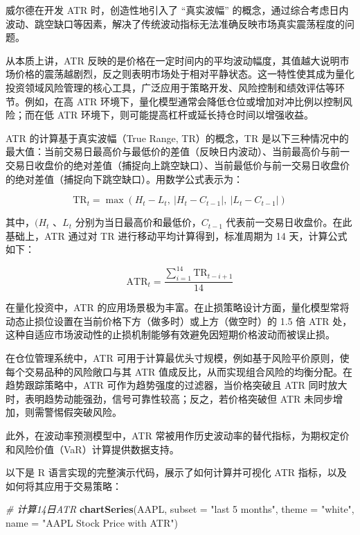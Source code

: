 \documentclass[]{ctexbook}
\newenvironment{Shaded}{\begin{snugshade}}{\end{snugshade}}
\newcommand{\AttributeTok}[1]{\textcolor[rgb]{0.13,0.29,0.53}{#1}}
\newcommand{\CommentTok}[1]{\textcolor[rgb]{0.56,0.35,0.01}{\textit{#1}}}
\newcommand{\FunctionTok}[1]{\textcolor[rgb]{0.13,0.29,0.53}{\textbf{#1}}}
\newcommand{\NormalTok}[1]{#1}
\newcommand{\StringTok}[1]{\textcolor[rgb]{0.31,0.60,0.02}{#1}}
\begin{document}
威尔德在开发 ATR 时，创造性地引入了 ``真实波幅'' 的概念，通过综合考虑日内波动、跳空缺口等因素，解决了传统波动指标无法准确反映市场真实震荡程度的问题。

从本质上讲，ATR 反映的是价格在一定时间内的平均波动幅度，其值越大说明市场价格的震荡越剧烈，反之则表明市场处于相对平静状态。这一特性使其成为量化投资领域风险管理的核心工具，广泛应用于策略开发、风险控制和绩效评估等环节。例如，在高 ATR 环境下，量化模型通常会降低仓位或增加对冲比例以控制风险；而在低 ATR 环境下，则可能提高杠杆或延长持仓时间以增强收益。

ATR 的计算基于真实波幅（True Range, TR）的概念，TR 是以下三种情况中的最大值：当前交易日最高价与最低价的差值（反映日内波动）、当前最高价与前一交易日收盘价的绝对差值（捕捉向上跳空缺口）、当前最低价与前一交易日收盘价的绝对差值（捕捉向下跳空缺口）。用数学公式表示为：

\[
\text{TR}_t = \max\left(H_t - L_t, \ |H_t - C_{t-1}|, \ |L_t - C_{t-1}| \right)
\]

其中，\((H_t\) 、\(L_t\) 分别为当日最高价和最低价，\(C_{t-1}\) 代表前一交易日收盘价。在此基础上，ATR 通过对 TR 进行移动平均计算得到，标准周期为 14 天，计算公式如下：

\[\text{ATR}_t = \frac{\sum_{i=1}^{14} \text{TR}_{t-i+1}}{14}\]

在量化投资中，ATR 的应用场景极为丰富。在止损策略设计方面，量化模型常将动态止损位设置在当前价格下方（做多时）或上方（做空时）的 1.5 倍 ATR 处，这种自适应市场波动性的止损机制能够有效避免因短期价格波动而被误止损。

在仓位管理系统中，ATR 可用于计算最优头寸规模，例如基于风险平价原则，使每个交易品种的风险敞口与其 ATR 值成反比，从而实现组合风险的均衡分配。在趋势跟踪策略中，ATR 可作为趋势强度的过滤器，当价格突破且 ATR 同时放大时，表明趋势动能强劲，信号可靠性较高；反之，若价格突破但 ATR 未同步增加，则需警惕假突破风险。

此外，在波动率预测模型中，ATR 常被用作历史波动率的替代指标，为期权定价和风险价值（VaR）计算提供数据支持。

以下是 R 语言实现的完整演示代码，展示了如何计算并可视化 ATR 指标，以及如何将其应用于交易策略：

\begin{Shaded}
\begin{Highlighting}[]
\CommentTok{\# 计算14日ATR}
\FunctionTok{chartSeries}\NormalTok{(AAPL, }\AttributeTok{subset =} \StringTok{"last 5 months"}\NormalTok{, }\AttributeTok{theme =} \StringTok{"white"}\NormalTok{, }
            \AttributeTok{name =} \StringTok{"AAPL Stock Price with ATR"}\NormalTok{)}
\end{Highlighting}
\end{Shaded}
\end{document}
